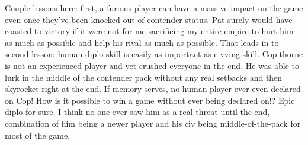 \documentclass[10pt]{article}
\begin{document}
Couple lessons here: first, a furious player can have a massive impact
on the game even once they've been knocked out of contender
status. Pat surely would have coasted to victory if it were not for me
sacrificing my entire empire to hurt him as much as possible and help
his rival as much as possible. That leads in to second lesson: human
diplo skill is easily as important as civving skill. Copithorne is not
an experienced player and yet crushed everyone in the end. He was able
to lurk in the middle of the contender pack without any real setbacks
and then skyrocket right at the end. If memory serves, no human player
ever even declared on Cop!  How is it possible to win a game without
ever being declared on!? Epic diplo for sure. I think no one ever saw
him as a real threat until the end, combination of him being a newer
player and his civ being middle-of-the-pack for most of the game.
\end{document}
